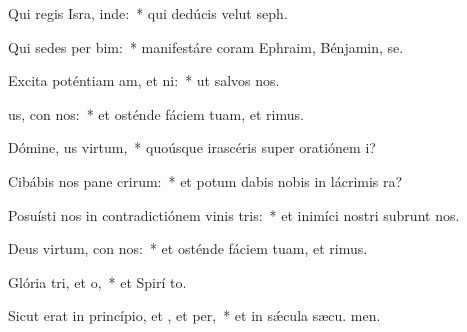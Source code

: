 \item Qui regis Isra, inde:~* qui dedúcis velut  seph.
\item Qui sedes per bim:~* manifestáre coram Ephraim, Bénjamin,  se.
\item Excita poténtiam am, et ni:~* ut salvos  nos.
\item {}us, con nos:~* et osténde fáciem tuam, et  rimus.
\item Dómine, us virtum,~* quoúsque irascéris super oratiónem  i?
\item Cibábis nos pane crirum:~* et potum dabis nobis in lácrimis  ra?
\item Posuísti nos in contradictiónem vinis tris:~* et inimíci nostri subrunt nos.
\item Deus virtum, con nos:~* et osténde fáciem tuam, et  rimus.
\item Glória tri, et o,~* et Spirí to.
\item Sicut erat in princípio, et , et per,~* et in sǽcula sæcu. men.
